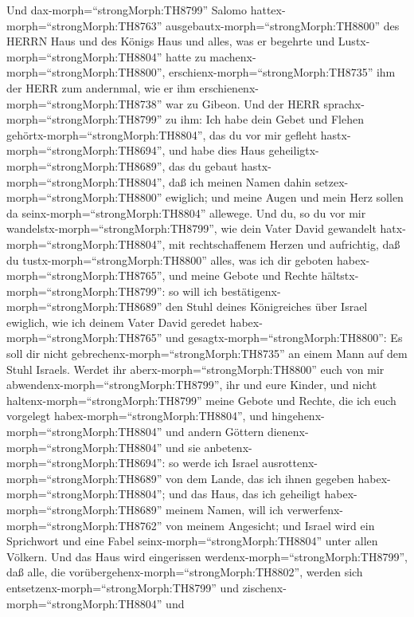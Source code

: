  Und dax-morph=``strongMorph:TH8799'' Salomo
hattex-morph=``strongMorph:TH8763''
ausgebautx-morph=``strongMorph:TH8800'' des HERRN Haus und des Königs
Haus und alles, was er begehrte und Lustx-morph=``strongMorph:TH8804''
hatte zu machenx-morph=``strongMorph:TH8800'', 
erschienx-morph=``strongMorph:TH8735'' ihm der HERR zum andernmal, wie
er ihm erschienenx-morph=``strongMorph:TH8738'' war zu Gibeon.
 Und der HERR sprachx-morph=``strongMorph:TH8799'' zu ihm:
Ich habe dein Gebet und Flehen gehörtx-morph=``strongMorph:TH8804'', das
du vor mir gefleht hastx-morph=``strongMorph:TH8694'', und habe dies
Haus geheiligtx-morph=``strongMorph:TH8689'', das du gebaut
hastx-morph=``strongMorph:TH8804'', daß ich meinen Namen dahin
setzex-morph=``strongMorph:TH8800'' ewiglich; und meine Augen und mein
Herz sollen da seinx-morph=``strongMorph:TH8804'' allewege. 
Und du, so du vor mir wandelstx-morph=``strongMorph:TH8799'', wie dein
Vater David gewandelt hatx-morph=``strongMorph:TH8804'', mit
rechtschaffenem Herzen und aufrichtig, daß du
tustx-morph=``strongMorph:TH8800'' alles, was ich dir geboten
habex-morph=``strongMorph:TH8765'', und meine Gebote und Rechte
hältstx-morph=``strongMorph:TH8799'':  so will ich
bestätigenx-morph=``strongMorph:TH8689'' den Stuhl deines Königreiches
über Israel ewiglich, wie ich deinem Vater David geredet
habex-morph=``strongMorph:TH8765'' und
gesagtx-morph=``strongMorph:TH8800'': Es soll dir nicht
gebrechenx-morph=``strongMorph:TH8735'' an einem Mann auf dem Stuhl
Israels.  Werdet ihr aberx-morph=``strongMorph:TH8800'' euch
von mir abwendenx-morph=``strongMorph:TH8799'', ihr und eure Kinder, und
nicht haltenx-morph=``strongMorph:TH8799'' meine Gebote und Rechte, die
ich euch vorgelegt habex-morph=``strongMorph:TH8804'', und
hingehenx-morph=``strongMorph:TH8804'' und andern Göttern
dienenx-morph=``strongMorph:TH8804'' und sie
anbetenx-morph=``strongMorph:TH8694'':  so werde ich Israel
ausrottenx-morph=``strongMorph:TH8689'' von dem Lande, das ich ihnen
gegeben habex-morph=``strongMorph:TH8804''; und das Haus, das ich
geheiligt habex-morph=``strongMorph:TH8689'' meinem Namen, will ich
verwerfenx-morph=``strongMorph:TH8762'' von meinem Angesicht; und Israel
wird ein Sprichwort und eine Fabel seinx-morph=``strongMorph:TH8804''
unter allen Völkern.  Und das Haus wird eingerissen
werdenx-morph=``strongMorph:TH8799'', daß alle, die
vorübergehenx-morph=``strongMorph:TH8802'', werden sich
entsetzenx-morph=``strongMorph:TH8799'' und
zischenx-morph=``strongMorph:TH8804'' und
